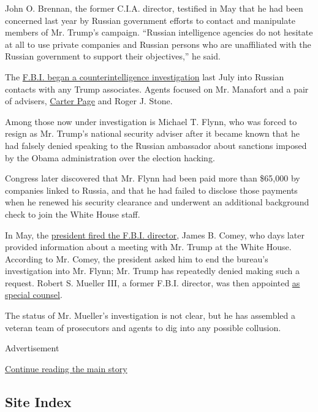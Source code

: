 John O. Brennan, the former C.I.A. director, testified in May that he
had been concerned last year by Russian government efforts to contact
and manipulate members of Mr. Trump's campaign. ``Russian intelligence
agencies do not hesitate at all to use private companies and Russian
persons who are unaffiliated with the Russian government to support
their objectives,'' he said.

The
\href{https://www.nytimes3xbfgragh.onion/2017/03/20/us/politics/fbi-investigation-trump-russia-comey.html}{F.B.I.
began a counterintelligence investigation} last July into Russian
contacts with any Trump associates. Agents focused on Mr. Manafort and a
pair of advisers,
\href{https://www.nytimes3xbfgragh.onion/2017/04/19/us/politics/carter-page-russia-trump.html}{Carter
Page} and Roger J. Stone.

Among those now under investigation is Michael T. Flynn, who was forced
to resign as Mr. Trump's national security adviser after it became known
that he had falsely denied speaking to the Russian ambassador about
sanctions imposed by the Obama administration over the election hacking.

Congress later discovered that Mr. Flynn had been paid more than
\$65,000 by companies linked to Russia, and that he had failed to
disclose those payments when he renewed his security clearance and
underwent an additional background check to join the White House staff.

In May, the
\href{https://www.nytimes3xbfgragh.onion/2017/05/09/us/politics/james-comey-fired-fbi.html}{president
fired the F.B.I. director}, James B. Comey, who days later provided
information about a meeting with Mr. Trump at the White House. According
to Mr. Comey, the president asked him to end the bureau's investigation
into Mr. Flynn; Mr. Trump has repeatedly denied making such a request.
Robert S. Mueller III, a former F.B.I. director, was then appointed
\href{https://www.nytimes3xbfgragh.onion/2017/05/17/us/politics/robert-mueller-special-counsel-russia-investigation.html}{as
special counsel}.

The status of Mr. Mueller's investigation is not clear, but he has
assembled a veteran team of prosecutors and agents to dig into any
possible collusion.

Advertisement

\protect\hyperlink{after-bottom}{Continue reading the main story}

\hypertarget{site-index}{%
\subsection{Site Index}\label{site-index}}

